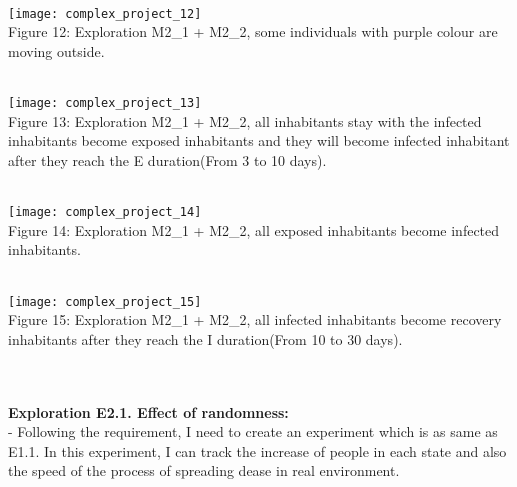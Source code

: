 \documentclass{article}
\begin{document}
\\
\texttt{[image: complex\_project\_12]}
\\
\caption{Figure 12: Exploration M2\_1 + M2\_2, some individuals with purple colour are moving outside.} 
\\
\texttt{[image: complex\_project\_13]}
\\
\caption{Figure 13: Exploration M2\_1 + M2\_2, all inhabitants stay with the infected inhabitants become exposed inhabitants and they will become infected inhabitant after they reach the E duration(From 3 to 10 days).} 
\\
\texttt{[image: complex\_project\_14]}
\\
\caption{Figure 14: Exploration M2\_1 + M2\_2, all exposed inhabitants become infected inhabitants.} 
\\
\texttt{[image: complex\_project\_15]}
\\
\caption{Figure 15: Exploration M2\_1 + M2\_2, all infected inhabitants become recovery inhabitants after they reach the I duration(From 10 to 30 days).} 
\\\\
\textbf{Exploration E2.1. Effect of randomness:}
\\- Following the requirement, I need to create an experiment which is as same as E1.1. In this experiment, I can track the increase of people in each state and also the speed of the process of spreading dease in real environment.
\end{document}
